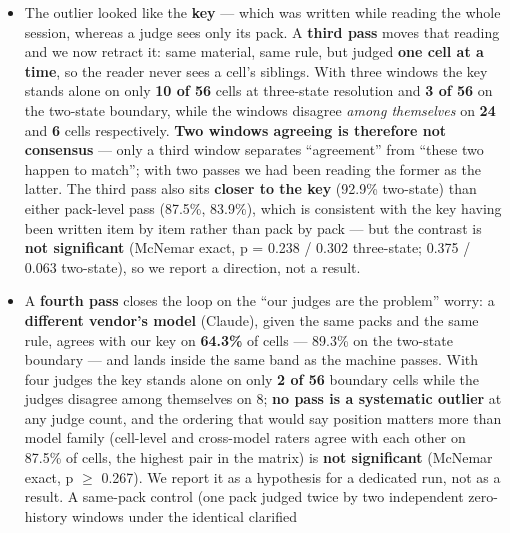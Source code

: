 \documentclass[
]{article}
\begin{document}
\begin{itemize}
{  \ensuremath{\kappa} = 0.502} and \textbf{82.6\% / \ensuremath{\kappa}
  = 0.336}. The three-state numbers earlier in this bullet are
  \textbf{de-duplicated} --- we label each rather than quoting one ruler
  for both.) One further reading is worth stating because it points away
  from the judges: \textbf{the two passes agree with each other on 42 of
  56 cells (75.0\%), while each agrees with our key at 55--57\%}.
\item
  The outlier looked like the \textbf{key} --- which was written while
  reading the whole session, whereas a judge sees only its pack. A
  \textbf{third pass} moves that reading and we now retract it: same
  material, same rule, but judged \textbf{one cell at a time}, so the
  reader never sees a cell's siblings. With three windows the key stands
  alone on only \textbf{10 of 56} cells at three-state resolution and
  \textbf{3 of 56} on the two-state boundary, while the windows disagree
  \emph{among themselves} on \textbf{24} and \textbf{6} cells
  respectively. \textbf{Two windows agreeing is therefore not consensus}
  --- only a third window separates ``agreement'' from ``these two
  happen to match''; with two passes we had been reading the former as
  the latter. The third pass also sits \textbf{closer to the key}
  (92.9\% two-state) than either pack-level pass (87.5\%, 83.9\%), which
  is consistent with the key having been written item by item rather
  than pack by pack --- but the contrast is \textbf{not significant}
  (McNemar exact, p = 0.238 / 0.302 three-state; 0.375 / 0.063
  two-state), so we report a direction, not a result.
\item
  A \textbf{fourth pass} closes the loop on the ``our judges are the
  problem'' worry: a \textbf{different vendor's model} (Claude), given
  the same packs and the same rule, agrees with our key on
  \textbf{64.3\%} of cells --- 89.3\% on the two-state boundary --- and
  lands inside the same band as the machine passes. With four judges the
  key stands alone on only \textbf{2 of 56} boundary cells while the
  judges disagree among themselves on 8; \textbf{no pass is a systematic
  outlier} at any judge count, and the ordering that would say position
  matters more than model family (cell-level and cross-model raters
  agree with each other on 87.5\% of cells, the highest pair in the
  matrix) is \textbf{not significant} (McNemar exact, p
  \ensuremath{\geq} 0.267). We report it as a hypothesis for a dedicated
  run, not as a result. A same-pack control (one pack judged twice by
  two independent zero-history windows under the identical clarified

\end{itemize}
\end{document}
